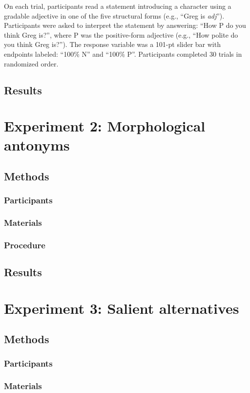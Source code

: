 \documentclass[10pt,letterpaper]{article}
\begin{document}
On each trial, participants read a statement introducing a character using a gradable adjective in one of the five structural forms (e.g., ``Greg is \emph{adj}'').
Participants were asked to interpret the statement by answering: ``How P do you think Greg is?'', where P was the positive-form adjective (e.g., ``How polite do you think Greg is?'').
The response variable was a 101-pt slider bar with endpoints labeled: ``100\% N'' and ``100\% P''.
Participants completed 30 trials in randomized order.

\subsection{Results}

\section{Experiment 2: Morphological antonyms}


\subsection{Methods}
\subsubsection{Participants}
\subsubsection{Materials}
\subsubsection{Procedure}
\subsection{Results}


\section{Experiment 3: Salient alternatives}

\subsection{Methods}
\subsubsection{Participants}
\subsubsection{Materials}
\end{document}
